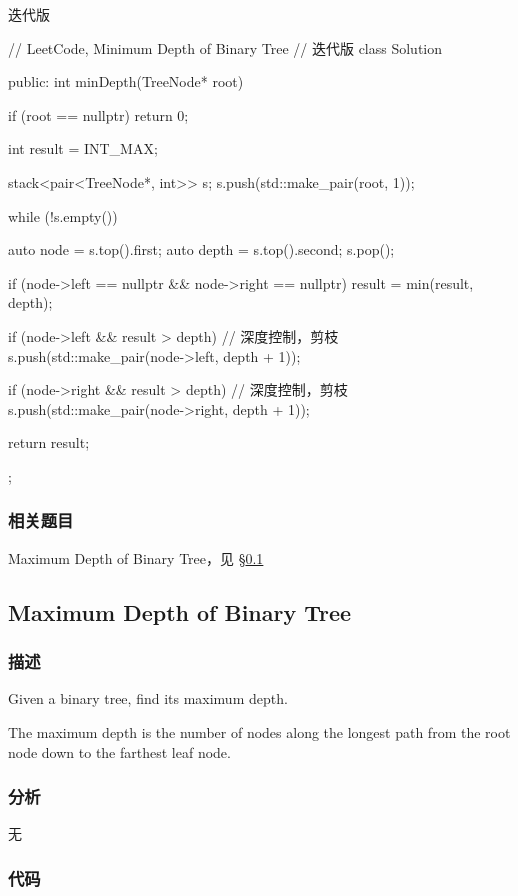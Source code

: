 迭代版
\begin{Code}
// LeetCode, Minimum Depth of Binary Tree
// 迭代版
class Solution {
public:
    int minDepth(TreeNode* root) {
        if (root == nullptr)
            return 0;

        int result = INT_MAX;

        stack<pair<TreeNode*, int>> s;
        s.push(std::make_pair(root, 1));

        while (!s.empty()) {
            auto node = s.top().first;
            auto depth = s.top().second;
            s.pop();

            if (node->left == nullptr && node->right == nullptr)
                result = min(result, depth);

            if (node->left && result > depth) // 深度控制，剪枝
                s.push(std::make_pair(node->left, depth + 1));

            if (node->right && result > depth) // 深度控制，剪枝
                s.push(std::make_pair(node->right, depth + 1));
        }

        return result;
    }
};
\end{Code}

\subsubsection{相关题目}
\begindot
\item Maximum Depth of Binary Tree，见 \S \ref{sec:maximum-depth-of-binary-tree}
\myenddot


\subsection{Maximum Depth of Binary Tree}
\label{sec:maximum-depth-of-binary-tree}


\subsubsection{描述}
Given a binary tree, find its maximum depth.

The maximum depth is the number of nodes along the longest path from the root node down to the farthest leaf node.


\subsubsection{分析}
无

\subsubsection{代码}

